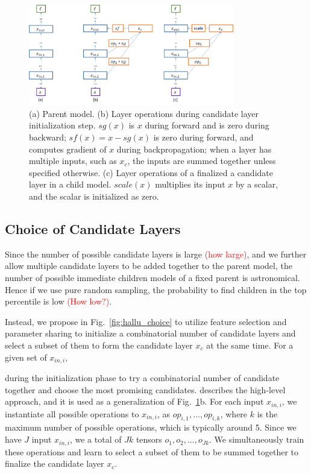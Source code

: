 \documentclass{article}
\newcommand{\todo}[1]{\textcolor{red}{#1}}
\begin{document}
\begin{figure}
    \centering
    \includegraphics[keepaspectratio, width=0.8\textwidth]{img/hallu_steps.png}
    \caption{(a) Parent model.
    (b) Layer operations during candidate layer initialization step. $sg(x)$ is $x$ during forward and is zero during backward; $sf(x) = x - sg(x)$ is zero during forward, and computes gradient of $x$ during backpropagation; when a layer has multiple inputs, such as $x_c$, the inputs are summed together unless specified otherwise.
    (c) Layer operations of a finalized a candidate layer in a child model. 
    $scale(x)$ multiplies its input $x$ by a scalar, and the scalar is initialized as zero. }
    \label{fig:hallu_steps}
\end{figure}


\subsection{Choice of Candidate Layers}
\label{sec:hallu_choice}

Since the number of possible candidate layers is large \todo{(how large)}, and we further allow multiple candidate layers to be added together to the parent model, the number of possible immediate children models of a fixed parent is astronomical. 
Hence if we use pure random sampling, the probability to find children in the top percentile is low \todo{(How low?)}. 

Instead, we propose in Fig.~\ref{fig:hallu_choice} to utilize feature selection and parameter sharing to initialize a combinatorial number of candidate layers and select a subset of them to form the candidate layer $x_c$ at the same time. For a given set of $x_{in,i}$, 



during the initialization phase to try a combinatorial number of candidate together and choose the most promising candidates.
 describes the high-level approach, and it is used as a generalization of Fig.~\ref{fig:hallu_steps}b. For each input $x_{in,i}$, we instantiate all possible operations to $x_{in,i}$, as $op_{i,1}, ..., op_{i,k}$, where $k$ is the maximum number of possible operations, which is typically around 5. Since we have $J$ input $x_{in,i}$, we a total of $Jk$ tensors $o_1, o_2, ..., o_{Jk}$. We simultaneously train these operations and learn to select a subset of them to be summed together to finalize the candidate layer $x_c$.
\end{document}
